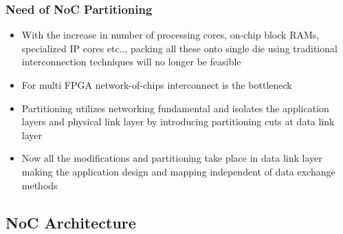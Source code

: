 \begin{frame}
\frametitle{Need of NoC Partitioning}
\footnotesize
\begin{itemize}
\item With the increase in number of processing cores, on-chip block RAMs, specialized IP cores etc.., packing all these onto single die using traditional interconnection techniques will no longer be feasible
\item For multi FPGA network-of-chips interconnect is the bottleneck
\item Partitioning utilizes networking fundamental and isolates the application layers and physical link layer by introducing partitioning cuts at data link layer
\item Now all the modifications and partitioning take place in data link layer making the application design and mapping independent of data exchange methods
\end{itemize} 
\normalsize
\end{frame}


\subsection{NoC Architecture}

